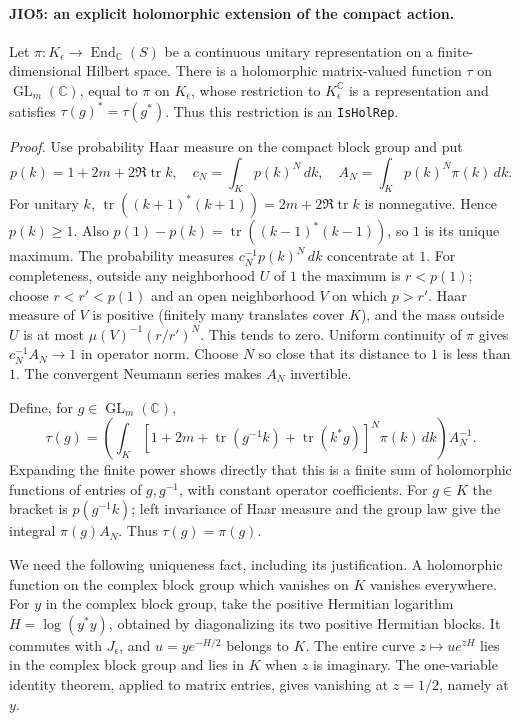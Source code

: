 \paragraph{JIO5: an explicit holomorphic extension of the compact action.}
\label{claim:JIO5}
Let \(\pi:K_\epsilon\to\operatorname{End}_{\mathbb C}(S)\)
be a continuous unitary representation on a finite-dimensional
Hilbert space.  There is a holomorphic matrix-valued function
\(\tau\) on \(\operatorname{GL}_m(\mathbb C)\), equal to \(\pi\)
on \(K_\epsilon\), whose restriction to \(K_\epsilon^{\mathbb C}\)
is a representation and satisfies \(\tau(g)^*=\tau(g^*)\).
Thus this restriction is an \texttt{IsHolRep}.

\emph{Proof.}
Use probability Haar measure on the compact block group and put
\[
 p(k)=1+2m+2\Re\operatorname{tr}k,\quad
 c_N=\int_Kp(k)^N\,dk,\quad
 A_N=\int_Kp(k)^N\pi(k)\,dk .
 \tag{JIO.15}
\]
For unitary \(k\),
\(\operatorname{tr}((k+1)^*(k+1))=2m+2\Re\operatorname{tr}k\)
is nonnegative.  Hence \(p(k)\ge1\).  Also
\(p(1)-p(k)=\operatorname{tr}((k-1)^*(k-1))\), so \(1\)
is its unique maximum.  The probability measures
\(c_N^{-1}p(k)^N\,dk\) concentrate at \(1\).
For completeness, outside any neighborhood \(U\) of \(1\) the
maximum is \(r<p(1)\); choose \(r<r'<p(1)\) and an open
neighborhood \(V\) on which \(p>r'\).  Haar measure of \(V\)
is positive (finitely many translates cover \(K\)), and the
mass outside \(U\) is at most
\(\mu(V)^{-1}(r/r')^N\).  This tends to zero.
Uniform continuity of \(\pi\) gives \(c_N^{-1}A_N\to1\) in
operator norm.  Choose \(N\) so close that its distance to \(1\)
is less than \(1\).  The convergent Neumann series makes \(A_N\)
invertible.

Define, for \(g\in\operatorname{GL}_m(\mathbb C)\),
\[
 \tau(g)=
 \left(\int_K
 [1+2m+\operatorname{tr}(g^{-1}k)+\operatorname{tr}(k^*g)]^N
                       \pi(k)\,dk\right)A_N^{-1}.
 \tag{JIO.16}
\]
Expanding the finite power shows directly that this is a finite
sum of holomorphic functions of entries of \(g,g^{-1}\), with
constant operator coefficients.  For \(g\in K\) the bracket is
\(p(g^{-1}k)\); left invariance of Haar measure and the group law
give the integral \(\pi(g)A_N\).  Thus \(\tau(g)=\pi(g)\).

We need the following uniqueness fact, including its justification.
A holomorphic function on the complex block group which vanishes
on \(K\) vanishes everywhere.  For \(y\) in the complex block
group, take the positive Hermitian logarithm
\(H=\log(y^*y)\), obtained by diagonalizing its two positive
Hermitian blocks.  It commutes with \(J_\epsilon\), and
\(u=y e^{-H/2}\) belongs to \(K\).  The entire curve
\(z\mapsto u e^{zH}\) lies in the complex block group and lies
in \(K\) when \(z\) is imaginary.  The one-variable identity
theorem, applied to matrix entries, gives vanishing at
\(z=1/2\), namely at \(y\).


